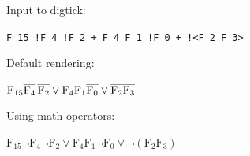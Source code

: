 \documentclass{article}
\begin{document}
\begin{minipage}{\linewidth}
Input to digtick:
\begin{sourcebox}\texttt{F\_15 !F\_4 !F\_2 + F\_4 F\_1 !F\_0 + !<F\_2 F\_3>}\end{sourcebox}
Default rendering:
\begin{renderedbox}$\mathrm{F_{15} \overline{F_4}\,\overline{F_2} \vee F_4 F_1 \overline{F_0} \vee \overline{F_2 F_3}}$\end{renderedbox}
Using math operators:
\begin{renderedbox}$\mathrm{F_{15} \neg F_4 \neg F_2 \vee F_4 F_1 \neg F_0 \vee \neg (F_2 F_3)}$\end{renderedbox}
\end{minipage}
\vspace{2cm}
\end{document}
